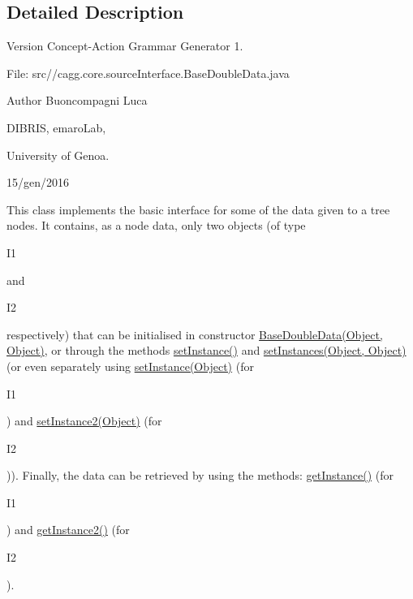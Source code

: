 \subsection{Detailed Description}
\begin{DoxyVersion}{Version}
Concept-\/\-Action Grammar Generator 1. \par
 File\-: src//cagg.core.\-source\-Interface.\-Base\-Double\-Data.\-java \par

\end{DoxyVersion}
\begin{DoxyAuthor}{Author}
Buoncompagni Luca \par
 D\-I\-B\-R\-I\-S, emaro\-Lab,\par
 University of Genoa. \par
 15/gen/2016 \par

\end{DoxyAuthor}


This class implements the basic interface for some of the data given to a tree nodes. It contains, as a node data, only two objects (of type
\begin{DoxyCode}
I1 
\end{DoxyCode}
 and
\begin{DoxyCode}
I2 
\end{DoxyCode}
 respectively) that can be initialised in constructor \hyperlink{}{Base\-Double\-Data(\-Object, Object)}, or through the methods \hyperlink{classit_1_1emarolab_1_1cagg_1_1core_1_1language_1_1BaseDoubleData_3_01I1_00_01I2_01_4_a72415e787450910fe81591f115d82411}{set\-Instance()} and \hyperlink{}{set\-Instances(\-Object, Object)} (or even separately using \hyperlink{}{set\-Instance(\-Object)} (for
\begin{DoxyCode}
I1 
\end{DoxyCode}
 ) and \hyperlink{}{set\-Instance2(\-Object)} (for
\begin{DoxyCode}
I2 
\end{DoxyCode}
 )). Finally, the data can be retrieved by using the methods\-: \hyperlink{classit_1_1emarolab_1_1cagg_1_1core_1_1language_1_1BaseDoubleData_3_01I1_00_01I2_01_4_a6afc0da242e3b63565b5c4450fa7a5b7}{get\-Instance()} (for
\begin{DoxyCode}
I1 
\end{DoxyCode}
 ) and \hyperlink{classit_1_1emarolab_1_1cagg_1_1core_1_1language_1_1BaseDoubleData_3_01I1_00_01I2_01_4_ad71c577180a9ea0c0246f84219b17fbe}{get\-Instance2()} (for
\begin{DoxyCode}
I2 
\end{DoxyCode}
 ). 

